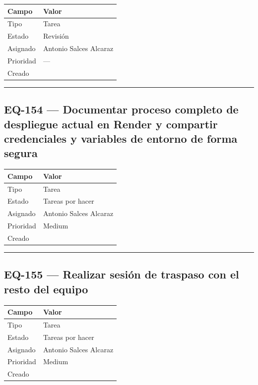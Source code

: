 \documentclass[
  spanish,
  11pt,
]{report}
\newcounter{none} %
\begin{document}
{\def\LTcaptype{none} %
\begin{longtable}[]{@{}ll@{}}
\toprule\noalign{}
Campo & Valor \\
\midrule\noalign{}
\endhead
\bottomrule\noalign{}
\endlastfoot
Tipo & Tarea \\
Estado & Revisión \\
Asignado & Antonio Salces Alcaraz \\
Prioridad & --- \\
Creado & \\
\end{longtable}
}

\begin{center}\rule{0.5\linewidth}{0.5pt}\end{center}

\subsection{EQ-154 --- Documentar proceso completo de despliegue actual
en Render y compartir credenciales y variables de entorno de forma
segura}\label{eq-154-documentar-proceso-completo-de-despliegue-actual-en-render-y-compartir-credenciales-y-variables-de-entorno-de-forma-segura}

{\def\LTcaptype{none} %
\begin{longtable}[]{@{}ll@{}}
\toprule\noalign{}
Campo & Valor \\
\midrule\noalign{}
\endhead
\bottomrule\noalign{}
\endlastfoot
Tipo & Tarea \\
Estado & Tareas por hacer \\
Asignado & Antonio Salces Alcaraz \\
Prioridad & Medium \\
Creado & \\
\end{longtable}
}

\begin{center}\rule{0.5\linewidth}{0.5pt}\end{center}

\subsection{EQ-155 --- Realizar sesión de traspaso con el resto del
equipo}\label{eq-155-realizar-sesiuxf3n-de-traspaso-con-el-resto-del-equipo}

{\def\LTcaptype{none} %
\begin{longtable}[]{@{}ll@{}}
\toprule\noalign{}
Campo & Valor \\
\midrule\noalign{}
\endhead
\bottomrule\noalign{}
\endlastfoot
Tipo & Tarea \\
Estado & Tareas por hacer \\
Asignado & Antonio Salces Alcaraz \\
Prioridad & Medium \\
Creado & \\
\end{longtable}
}
\end{document}
